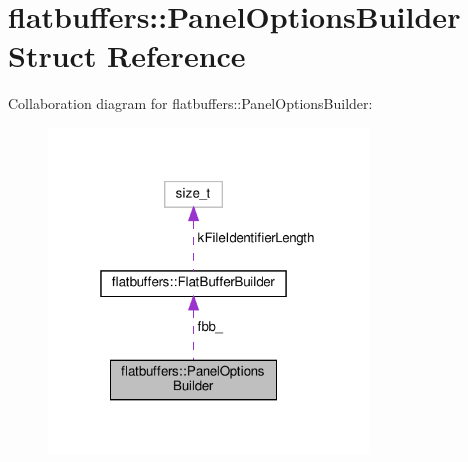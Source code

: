 \hypertarget{structflatbuffers_1_1PanelOptionsBuilder}{}\section{flatbuffers\+:\+:Panel\+Options\+Builder Struct Reference}
\label{structflatbuffers_1_1PanelOptionsBuilder}


Collaboration diagram for flatbuffers\+:\+:Panel\+Options\+Builder\+:
\nopagebreak
\begin{figure}[H]
\begin{center}
\leavevmode
\includegraphics[width=241pt]{structflatbuffers_1_1PanelOptionsBuilder__coll__graph}
\end{center}
\end{figure}
